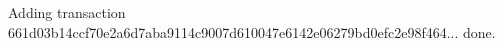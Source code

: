 \begin{shellbox}\begin{ttlst}
Adding transaction 661d03b14ccf70e2a6d7aba9114c9007d610047e6142e06279bd0efc2e98f464... done.
\end{ttlst}\end{shellbox}
